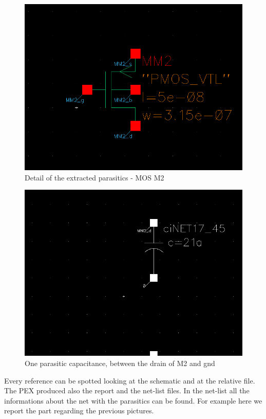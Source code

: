 \documentclass[a4paper]{article}
\begin{document}
\begin{figure}[H]
      \centering
       \includegraphics[width=12cm]{./Images/HA/HAX1_PEX_1.png}
\caption{Detail of the extracted parasitics - MOS M2}
\label{fig: PEX1}
\end{figure}

\begin{figure}[H]
      \centering
       \includegraphics[width=12cm]{./Images/HA/HAX1_PEX_2.png}
\caption{One parasitic capacitance, between the drain of M2 and gnd}
\label{fig: PEX2}
\end{figure}

Every reference can be spotted looking at the schematic and at the relative file. The PEX produced also the report and the net-list files. In the net-list all the informations about the net with the parasitics can be found. For example here we report the part regarding the previous pictures.
\end{document}
